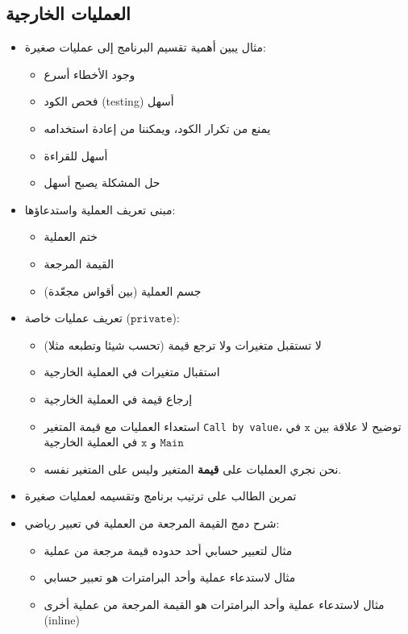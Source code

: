 ﻿\documentclass[12pt]{article}
\begin{document}
\subsection{العمليات الخارجية}


\begin{itemize}
    \item مثال يبين أهمية تقسيم البرنامج إلى عمليات صغيرة:
    \begin{itemize}
        \item وجود الأخطاء أسرع
        \item فحص الكود (testing) أسهل
        \item يمنع من تكرار الكود، ويمكننا من إعادة استخدامه
        \item أسهل للقراءة
        \item حل المشكلة يصبح أسهل
    \end{itemize}
    \item مبنى تعريف العملية واستدعاؤها:
    \begin{itemize}
        \item ختم العملية
        \item القيمة المرجعة
        \item جسم العملية (بين أقواس  مجعّدة)
    \end{itemize}
    \item تعريف عمليات خاصة ($\mathtt{private}$):
    \begin{itemize}
        \item لا تستقبل متغيرات ولا ترجع قيمة (تحسب شيئا وتطبعه مثلا)
        \item استقبال متغيرات في العملية الخارجية
        \item إرجاع قيمة في العملية الخارجية
        \item استعداء العمليات مع قيمة المتغير \textenglish{\texttt{Call by value}}، توضيح لا علاقة بين $\mathtt{x}$ في $\mathtt{Main}$ و $\mathtt{x}$ في العملية الخارجية
        \item نحن نجري العمليات على \textbf{قيمة} المتغير وليس على المتغير نفسه.
    \end{itemize}
    \item تمرين الطالب على ترتيب برنامج وتقسيمه لعمليات صغيرة
    \item شرح دمج القيمة المرجعة من العملية في تعبير رياضي:
    \begin{itemize}
        \item مثال لتعبير حسابي أحد حدوده قيمة مرجعة من عملية
        \item مثال لاستدعاء عملية وأحد البرامترات هو تعبير حسابي
        \item مثال لاستدعاء عملية وأحد البرامترات هو القيمة المرجعة من عملية أخرى (inline)
    \end{itemize}
\end{itemize}
\end{document}
